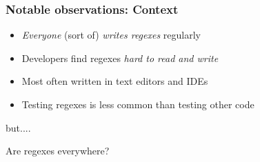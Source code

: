 

\begin{frame}
\frametitle{Notable observations: Context}

\begin{block}{}
\begin{itemize}
	\item {\em Everyone} (sort of) {\em writes regexes} regularly 
	\item Developers find regexes {\em hard to read and write}
	\item Most often written in text editors and IDEs
	\item Testing regexes is {less} common than testing other code
\end{itemize}
\end{block}

but....

\begin{block}{}
Are regexes everywhere?
\end{block}



\end{frame}









